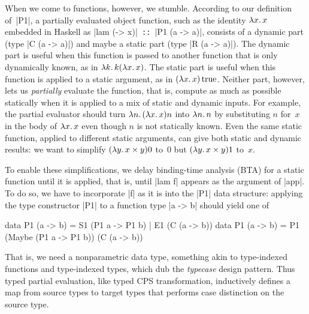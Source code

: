 When we come to functions, however, we stumble.  According to our
definition of~|P1|, a partially evaluated object function, such as the
identity $\mathopen{\lambda\mathord{x}.\,}x$ embedded in Haskell as |lam (\x -> x)|\texttt{ ::
}|P1 (a -> a)|, consists of a dynamic part (type |C (a -> a)|) and
maybe a static part (type |R (a -> a)|).  The dynamic part is useful
when this function is passed to another function that is only
dynamically known, as in $\mathopen{\lambda\mathord{k}.\,}k(\mathopen{\lambda\mathord{x}.\,}x)$.  The static part is
useful when this function is applied to a static argument, as in
$(\mathopen{\lambda\mathord{x}.\,}x)\mathinner{\mathrm{true}}$.  Neither part, however, lets us \emph{partially}
evaluate the function, that is, compute as much as possible statically
when it is applied to a mix of static and dynamic inputs.  For example,
the partial evaluator should turn $\mathopen{\lambda\mathord{n}.\,}(\mathopen{\lambda\mathord{x}.\,}x)n$ into $\mathopen{\lambda\mathord{n}.\,}n$
by substituting $n$ for~$x$ in the body of $\mathopen{\lambda\mathord{x}.\,}x$ even though $n$ is
not statically known.  Even the same static function, applied to
different static arguments, can give both static and dynamic results: we
want to simplify $(\mathopen{\lambda\mathord{y}.\,}x\times y)0$ to~$0$ but $(\mathopen{\lambda\mathord{y}.\,}x\times y)1$
to~$x$.

To enable these simplifications, we delay binding-time analysis (BTA)
for a static function until it is applied, that is, until |lam f|
appears as the argument of |app|.  To do so, we have to incorporate |f|
as it is into the |P1| data structure: applying the type constructor
|P1| to a function type |a -> b| should yield one of
\vspace*{-0.7em}
\begin{code3}
data P1 (a -> b) = S1 (P1 a -> P1 b) | E1 (C (a -> b))
data P1 (a -> b) = P1 (Maybe (P1 a -> P1 b)) (C (a -> b))
\end{code3}
\vspace*{-0.7em}
That is, we need a nonparametric data type, something akin to
type-indexed functions and type-indexed types, which
\citet{oliveira-typecase} dub the \emph{typecase} design pattern.
Thus typed partial evaluation, like typed CPS transformation,
inductively defines a map from source types to target types that
performs case distinction on the source type.
\begin{comment}

Thus typed partial evaluation, like typed CPS transformation,
inductively defines a map from source types to target types that
performs case distinction on the source type.  The connection with CPS
is not an accident, as we shall see in~\S\ref{S:CPS}.
\end{comment}

